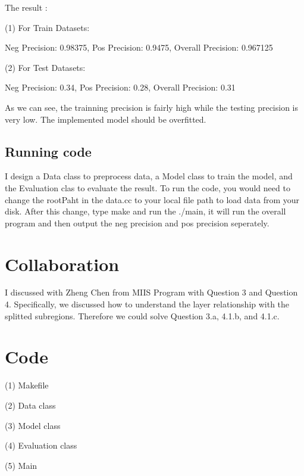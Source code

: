 \documentclass{article} %
\begin{document}
The result :

(1) For Train Datasets:

Neg Precision: 0.98375, Pos Precision: 0.9475, Overall Precision: 0.967125

(2) For Test Datasets:

Neg Precision: 0.34, Pos Precision: 0.28, Overall Precision: 0.31

As we can see, the trainning precision is fairly high while the testing
precision is very low. The implemented model should be overfitted.


\subsection{Running code}
I design a Data class to preprocess data, a Model class to train the model, and
the Evaluation clas to evaluate the result. To run the code, you would need to
change the rootPaht in the data.cc to your local file path to load data from
your disk. After this change, type make and run the ./main, it will run the
overall program and then output the neg precision and pos precision seperately.



\section{Collaboration}
I discussed with Zheng Chen from MIIS Program with Question 3 and Question 4.
Specifically, we discussed how to understand the layer relationship with the
splitted subregions. Therefore we could solve Question 3.a, 4.1.b, and 4.1.c.



\section{Code}

(1) Makefile




(2) Data class





(3) Model class




(4) Evaluation class




(5) Main


\end{document}
